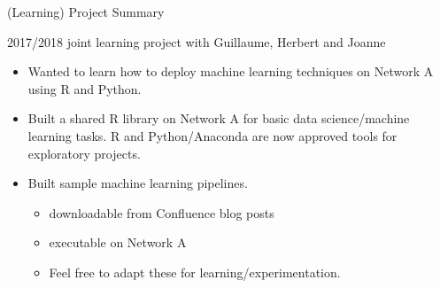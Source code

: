 


\begin{frame}{\LARGE (Learning) Project Summary}

\small

\begin{center}
{\normalsize 2017/2018 joint learning project with\vskip 0.15cm \Large Guillaume, Herbert and Joanne}
\end{center}

\begin{itemize}
\item
	Wanted to learn how to deploy machine learning techniques on Network A using R and Python.
\item
	Built a shared R library on Network A for basic data science/machine learning tasks.
	\vskip -0.1cm
	{\footnotesize R and Python/Anaconda are now approved tools for exploratory projects.}
\item
	Built sample machine learning pipelines.
	\begin{itemize}
	\item
		downloadable from Confluence blog posts
	\item
		executable on Network A
	\item
		{\color{red}Feel free to adapt these for learning/experimentation.}
	\end{itemize}
\end{itemize}

\end{frame}
\normalsize

